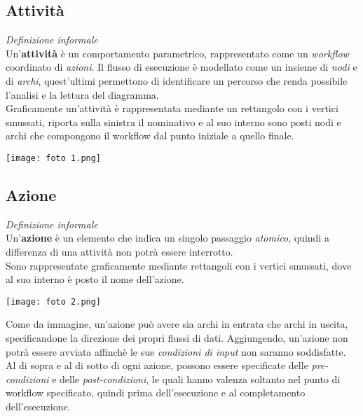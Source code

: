 \documentclass{article}
\begin{document}
\subsection*{Attività}
\large
\textit{Definizione informale}\\Un'\textbf{attività} è un comportamento parametrico, rappresentato come un \textit{workflow} coordinato di \textit{azioni}. Il flusso di esecuzione è modellato come un insieme di \textit{nodi} e di \textit{archi}, quest'ultimi permettono di identificare un percorso che renda possibile l'analisi e la lettura del diagramma.\vspace*{14pt}\\
Graficamente un'attività è rappresentata mediante un rettangolo con i vertici smussati, riporta sulla sinistra il nominativo e al suo interno sono posti nodi e archi che compongono il workflow dal punto iniziale a quello finale.\\
\begin{center}
    \texttt{[image: foto 1.png]}
\end{center}

\subsection*{Azione}
\large
\textit{Definizione informale}\\Un'\textbf{azione} è un elemento che indica un singolo passaggio \textit{atomico}, quindi a differenza di una attività non potrà essere interrotto.\vspace*{14pt}\\
Sono rappresentate graficamente mediante rettangoli con i vertici smussati, dove al suo interno è posto il nome dell'azione.\\
\begin{center}
    \texttt{[image: foto 2.png]}
\end{center}
Come da immagine, un'azione può avere sia archi in entrata che archi in uscita, specificandone la direzione dei propri flussi di dati. Aggiungendo, un'azione non potrà essere avviata affinchè le sue \textit{condizioni di input} non saranno soddisfatte.\vspace*{14pt}\\
Al di sopra e al di sotto di ogni azione, possono essere specificate delle \textit{pre-condizioni} e delle \textit{post-condizioni}, le quali hanno valenza soltanto nel punto di workflow specificato, quindi prima dell'esecuzione e al completamento dell'esecuzione.
\end{document}
